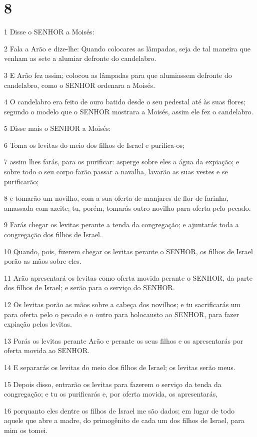 \chapter{8}

\par 1 Disse o SENHOR a Moisés:
\par 2 Fala a Arão e dize-lhe: Quando colocares as lâmpadas, seja de tal maneira que venham as sete a alumiar defronte do candelabro.
\par 3 E Arão fez assim; colocou as lâmpadas para que alumiassem defronte do candelabro, como o SENHOR ordenara a Moisés.
\par 4 O candelabro era feito de ouro batido desde o seu pedestal até às suas flores; segundo o modelo que o SENHOR mostrara a Moisés, assim ele fez o candelabro.
\par 5 Disse mais o SENHOR a Moisés:
\par 6 Toma os levitas do meio dos filhos de Israel e purifica-os;
\par 7 assim lhes farás, para os purificar: asperge sobre eles a água da expiação; e sobre todo o seu corpo farão passar a navalha, lavarão as suas vestes e se purificarão;
\par 8 e tomarão um novilho, com a sua oferta de manjares de flor de farinha, amassada com azeite; tu, porém, tomarás outro novilho para oferta pelo pecado.
\par 9 Farás chegar os levitas perante a tenda da congregação; e ajuntarás toda a congregação dos filhos de Israel.
\par 10 Quando, pois, fizerem chegar os levitas perante o SENHOR, os filhos de Israel porão as mãos sobre eles.
\par 11 Arão apresentará os levitas como oferta movida perante o SENHOR, da parte dos filhos de Israel; e serão para o serviço do SENHOR.
\par 12 Os levitas porão as mãos sobre a cabeça dos novilhos; e tu sacrificarás um para oferta pelo o pecado e o outro para holocausto ao SENHOR, para fazer expiação pelos levitas.
\par 13 Porás os levitas perante Arão e perante os seus filhos e os apresentarás por oferta movida ao SENHOR.
\par 14 E separarás os levitas do meio dos filhos de Israel; os levitas serão meus.
\par 15 Depois disso, entrarão os levitas para fazerem o serviço da tenda da congregação; e tu os purificarás e, por oferta movida, os apresentarás,
\par 16 porquanto eles dentre os filhos de Israel me são dados; em lugar de todo aquele que abre a madre, do primogênito de cada um dos filhos de Israel, para mim os tomei.
